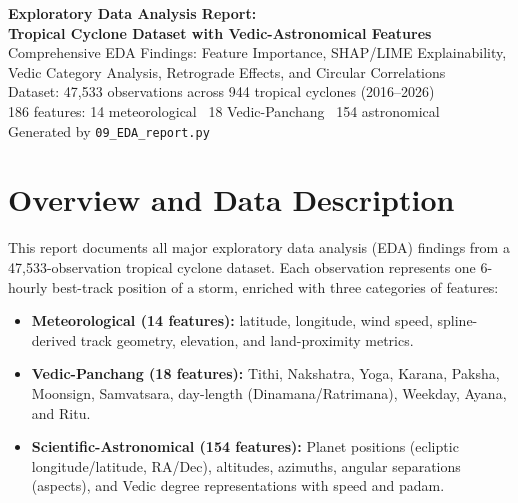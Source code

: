 \documentclass[11pt,a4paper]{article}
\begin{document}
\begin{titlepage}
  \centering
  \vspace*{2cm}
  {\Large\bfseries Exploratory Data Analysis Report:\\[0.4em]
   Tropical Cyclone Dataset with Vedic-Astronomical Features}\\[1.5cm]
  {\large Comprehensive EDA Findings: Feature Importance, SHAP/LIME Explainability,\\
   Vedic Category Analysis, Retrograde Effects, and Circular Correlations}\\[1.0cm]
  {\normalsize Dataset: 47,533 observations across 944 tropical cyclones (2016--2026)\\
   186 features: 14 meteorological \textbullet\ 
   18 Vedic-Panchang \textbullet\ 154 astronomical}\\[2cm]
  {\small Generated by \texorpdfstring{\texttt{09\_EDA\_report.py}}{09_EDA_report.py}}
\end{titlepage}

\tableofcontents
\newpage

\section{Overview and Data Description}

This report documents all major exploratory data analysis (EDA) findings from a
47,533-observation tropical cyclone dataset. Each observation represents one
6-hourly best-track position of a storm, enriched with three categories of features:

\begin{itemize}[noitemsep]
  \item \textbf{Meteorological (14 features):} latitude, longitude, wind speed, spline-derived
        track geometry, elevation, and land-proximity metrics.
  \item \textbf{Vedic-Panchang (18 features):} Tithi, Nakshatra, Yoga, Karana, Paksha,
        Moonsign, Samvatsara, day-length (Dinamana/Ratrimana), Weekday, Ayana, and Ritu.
  \item \textbf{Scientific-Astronomical (154 features):} Planet positions (ecliptic
        longitude/latitude, RA/Dec), altitudes, azimuths, angular separations (aspects),
        and Vedic degree representations with speed and padam.
\end{itemize}
\end{document}
